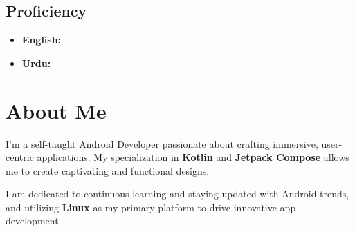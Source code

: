 \documentclass[bold]{deedy-resume-openfont}
\begin{document}
\begin{minipage}[t]{0.33\textwidth}
\subsection{Proficiency}
\begin{itemize}[label=\textbullet, leftmargin=*, topsep=5pt, itemsep=-1ex]
    \item \textbf{English:} 
    \item \textbf{Urdu:} 
\end{itemize}
\sectionsep


%
%

\end{minipage} 
\hfill
\begin{minipage}[t]{0.66\textwidth} 


\section{About Me}
\descript{}
\vspace{10pt} %
\begin{tightemize}
\item I'm a self-taught Android Developer passionate about crafting immersive, user-centric applications. My specialization in \textbf{Kotlin} and \textbf{Jetpack Compose} allows me to create captivating and functional designs. \\ 
\item I am dedicated to continuous learning and staying updated with Android trends, and utilizing \textbf{Linux} as my primary platform to drive innovative app development.
\end{tightemize}
\sectionsep



\end{minipage}
\end{document}
